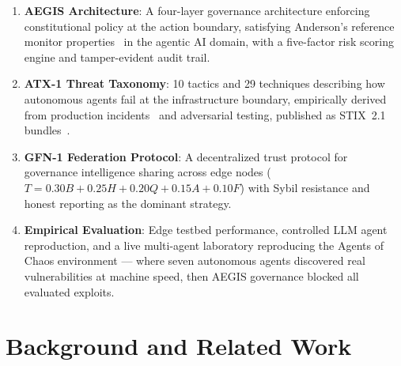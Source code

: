 \documentclass[journal]{IEEEtran}
\begin{document}
\begin{enumerate}
\item \textbf{AEGIS Architecture}: A four-layer governance architecture enforcing constitutional policy at the action boundary, satisfying Anderson's reference monitor properties~\cite{anderson1972} in the agentic AI domain, with a five-factor risk scoring engine and tamper-evident audit trail.

\item \textbf{ATX-1 Threat Taxonomy}: 10 tactics and 29 techniques describing how autonomous agents fail at the infrastructure boundary, empirically derived from production incidents~\cite{shapira2026} and adversarial testing, published as STIX~2.1 bundles~\cite{atx1_dataset}.

\item \textbf{GFN-1 Federation Protocol}: A decentralized trust protocol for governance intelligence sharing across edge nodes ($T = 0.30B + 0.25H + 0.20Q + 0.15A + 0.10F$) with Sybil resistance and honest reporting as the dominant strategy.

\item \textbf{Empirical Evaluation}: Edge testbed performance, controlled LLM agent reproduction, and a live multi-agent laboratory reproducing the Agents of Chaos environment --- where seven autonomous agents discovered real vulnerabilities at machine speed, then AEGIS governance blocked all evaluated exploits.
\end{enumerate}

\section{Background and Related Work}
\end{document}
